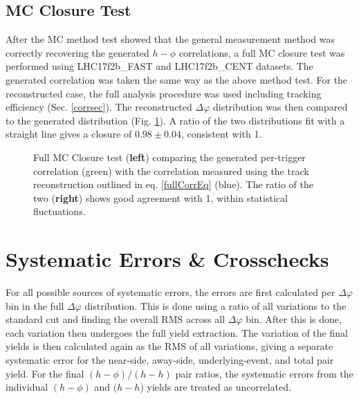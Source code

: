 \documentclass[ALICE,manyauthors]{ALICE_analysis_notes}
\begin{document}
\subsection{MC Closure Test}

After the MC method test showed that the general measurement method was correctly recovering the generated $h-\phi$ correlations, a full MC closure test was performed using LHC17f2b\_FAST and LHC17f2b\_CENT datasets.  The generated correlation was taken the same way as the above method test.  For the reconstructed case, the full analysis procedure was used including tracking efficiency (Sec. \ref{corrsec}).  The reconstructed $\Delta\varphi$ distribution was then compared to the generated distribution (Fig. \ref{MCClosureFAST}).  A ratio of the two distributions fit with a straight line gives a closure of $0.98\pm 0.04$, consistent with 1.

\begin{figure}[ht]
\centering
\begin{subfigure}{
\texttt{[image: images/truevsrecon\_notrigger.pdf]}}
\end{subfigure}
\begin{subfigure}{
\texttt{[image: images/ratio\_recon-true\_notrigger.pdf]}}
\end{subfigure}
\caption{Full MC Closure test (\textbf{left}) comparing the generated per-trigger correlation (green) with the correlation measured using the track reconstruction outlined in eq. \ref{fullCorrEq} (blue). The ratio of the two (\textbf{right}) shows good agreement with 1, within statistical fluctuations.}
\label{MCClosureFAST}
\end{figure}


\section{Systematic Errors \& Crosschecks}


For all possible sources of systematic errors, the errors are first calculated per $\Delta\varphi$ bin in the full $\Delta\varphi$ distribution.  This is done using a ratio of all variations to the standard cut and finding the overall RMS across all $\Delta\varphi$ bin. After this is done, each variation then undergoes the full yield extraction.  The variation of the final yields is then calculated again as the RMS of all variations, giving a separate systematic error for the near-side, away-side, underlying-event, and total pair yield.  For the final $(h-\phi)/(h-h)$ pair ratios, the systematic errors from the individual $(h-\phi)$ and $(h-h$) yields are treated as uncorrelated.
\end{document}
